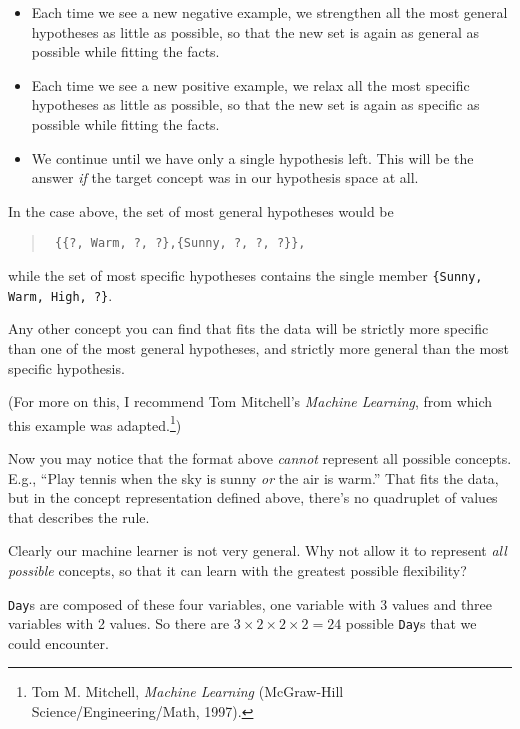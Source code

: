 {\begin{itemize}
\item{
 Each time we see a new negative example, we strengthen all the
most general hypotheses as little as possible, so that the new set is
again as general as possible while fitting the facts.}

\item{
 Each time we see a new positive example, we relax all the most
specific hypotheses as little as possible, so that the new set is again
as specific as possible while fitting the facts.}

\item{
 We continue until we have only a single hypothesis left. This will
be the answer \textit{if} the target concept was in our hypothesis
space at all.}
\end{itemize}


 In the case above, the set of most general hypotheses would be

\begin{verse}
\texttt{  \{\{?, Warm, ?, ?\},\{Sunny, ?, ?, ?\}\},}\\
\end{verse}


 while the set of most specific hypotheses contains the single
member \texttt{\{Sunny, Warm, High, ?\}}. 


 Any other concept you can find that fits the data will be strictly
more specific than one of the most general hypotheses, and strictly
more general than the most specific hypothesis.

{
 (For more on this, I recommend Tom Mitchell's
\textit{Machine Learning}, from which this example was
adapted.\footnote{Tom M. Mitchell, \textit{Machine Learning} (McGraw-Hill
Science/Engineering/Math, 1997).})}


 Now you may notice that the format above \textit{cannot} represent
all possible concepts. E.g., ``Play tennis when the
sky is sunny \textit{or} the air is warm.'' That fits
the data, but in the concept representation defined above,
there's no quadruplet of values that describes the
rule.


 Clearly our machine learner is not very general. Why not allow it
to represent \textit{all possible} concepts, so that it can learn with
the greatest possible flexibility?


 \texttt{Day}s are composed of these four variables, one variable with 3
values and three variables with 2 values. So there are $3 \times 2
\times 2 \times 2 = 24$ possible \texttt{Day}s that we could
encounter.


}
